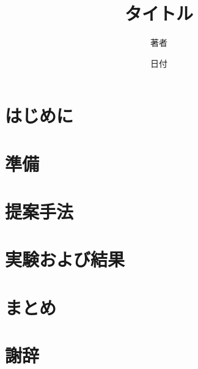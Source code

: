 \documentclass{ujarticle}
\begin{document}
\title{タイトル}
\author{著者}
\date{日付}

\maketitle

\section{はじめに}
\label{sec:introduction}


\section{準備}
\label{sec:preliminaries}


\section{提案手法}
\label{sec:proposed_method}


\section{実験および結果}
\label{sec:experiments_and_results}


\section{まとめ}
\label{sec:conclusion}


\section*{謝辞}

\printbibliography[title=参考文献]
\end{document}
